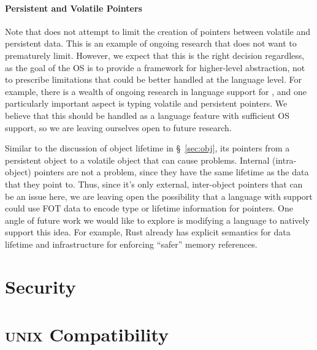 {        \paragraph{Persistent and Volatile Pointers}

        Note that \Twizzler does not attempt to limit the creation of pointers between volatile and
        persistent data. This is an example of ongoing \NVM research that \Twizzler does not want to
        prematurely limit. However, we expect that this is the right decision regardless, as the goal of the
        OS is to provide a framework for higher-level abstraction, not to prescribe limitations that could
        be better handled at the language level. For example, there is a wealth of ongoing research in
        language support for \NVM {}, and one particularly important aspect is typing volatile and
        persistent pointers. We believe that this should be handled as a language feature with sufficient OS
        support, so we are leaving ourselves open to future research.

        Similar to the discussion of object lifetime in \S~\ref{sec:obj}, its pointers from a persistent
        object to a volatile object that can cause problems. Internal (intra-object) pointers are not a
        problem, since they have the same lifetime as the data that they point to. Thus, since it's only
        external, inter-object pointers that can be an issue here, we are leaving open the possibility that
        a language with \Twizzler support could use FOT data to encode type or lifetime information for
        pointers. One angle of future work we would like to explore is modifying a language to natively
        support this idea. For example, Rust already has explicit semantics for data lifetime and
        infrastructure for enforcing ``safer'' memory references.
    \fi
}
\section{Security}

\section{\textsc{unix} Compatibility}
\label{sec:legacy}

